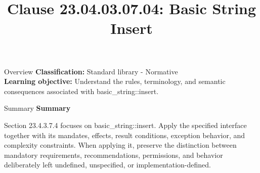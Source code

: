 \documentclass[10pt,letterpaper]{article}
\title{Clause 23.04.03.07.04: Basic String Insert}
\author{}
\date{}
\begin{document}
\maketitle
\begin{CornellOverviewBox}{Overview}
\textbf{Classification:} Standard library - Normative\\[2pt]
\textbf{Learning objective:} Understand the rules, terminology, and semantic consequences associated with basic\_string::insert.
\end{CornellOverviewBox}\begin{CornellSummaryBox}{Summary}
{\sffamily\bfseries\color{Accent} Summary}\par\vspace{3pt}Section 23.4.3.7.4 focuses on basic\_string::insert. Apply the specified interface together with its mandates, effects, result conditions, exception behavior, and complexity constraints. When applying it, preserve the distinction between mandatory requirements, recommendations, permissions, and behavior deliberately left undefined, unspecified, or implementation-defined.
\end{CornellSummaryBox}
\end{document}
